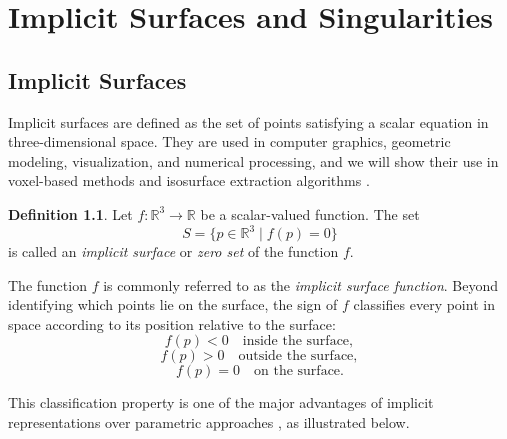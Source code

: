 \documentclass[12pt, a4paper, oneside]{book}
\theoremstyle{plain}
\theoremstyle{definition}
\newtheorem{definition}[theorem]{Definition}
\theoremstyle{remark}
\theoremstyle{definition}
\begin{document}


\newpage
\chapter{Implicit Surfaces and Singularities}


\section{Implicit Surfaces}
Implicit surfaces are defined as the set of points satisfying a scalar equation in three-dimensional space. They are used in computer graphics, geometric modeling, visualization, and numerical processing, and we will show their use in voxel-based methods and isosurface extraction algorithms \cite{bloomenthal2000implicit}.

\begin{definition}
\label{def:implicit-surface}
Let $f : \mathbb{R}^3 \to \mathbb{R}$ be a scalar-valued function. The set
\[
S = \{ p \in \mathbb{R}^3 \mid f(p) = 0 \}
\]
is called an \emph{implicit surface} or \emph{zero set} of the function $f$.
\end{definition}

The function $f$ is commonly referred to as the \emph{implicit surface function}. Beyond
identifying which points lie on the surface, the sign of $f$ classifies every point in
space according to its position relative to the surface:
\[
f(p) < 0 \quad \text{inside the surface},
\]
\[
f(p) > 0 \quad \text{outside the surface},
\]
\[
f(p) = 0 \quad \text{on the surface}.
\]

This classification property is one of the major advantages of implicit representations
over parametric approaches \cite{bloomenthal2000implicit}, as illustrated below.

\begin{center}
\end{center}
\end{document}

